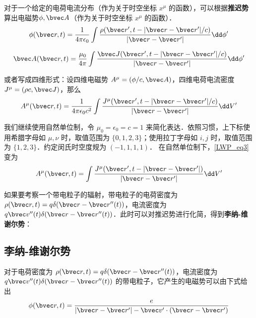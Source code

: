 

对于一个给定的电荷电流分布（作为关于时空坐标 $x^\mu$ 的函数），可以根据\textbf{推迟势}算出电磁势$\phi,\bvec A$（作为关于时空坐标 $x^\mu$ 的函数）．
\begin{equation}
\phi(\bvec r,t)=\frac{1}{4\pi\epsilon_0}\int \frac{\rho(\bvec r',t-|\bvec r-\bvec r'|/c)}{|\bvec r-\bvec r'|}\dd \phi'
\end{equation}

\begin{equation}
\bvec A(\bvec r,t)=\frac{\mu_0}{4\pi}\int \frac{\bvec J(\bvec r',t-|\bvec r-\bvec r'|/c)}{|\bvec r-\bvec r'|}\dd \phi'
\end{equation}

或者写成四维形式：设四维电磁势 $A^\mu=(\phi/c,\bvec A)$，四维电荷电流密度 $J^\mu=(\rho c,\bvec J)$，那么
\begin{equation}\label{LWP_eq3}
A^\mu(\bvec r,t)=\frac{1}{4\pi\epsilon_0c^2}\int \frac{J^\mu(\bvec r',t-|\bvec r-\bvec r'|/c)}{|\bvec r-\bvec r'|}\dd V'
\end{equation}

我们继续使用自然单位制，令 $\mu_0=\epsilon_0=c=1$ 来简化表达．依照习惯，上下标使用希腊字母如 $\mu, \nu$ 时，取值范围为 $\{0, 1, 2, 3\}$；使用拉丁字母如 $i, j$ 时，取值范围为 $\{1, 2, 3\}$．约定闵氏时空度规为 $(-1,1,1,1)$．
在自然单位制下，\autoref{LWP_eq3} 变为
\begin{equation}\label{LWP_eq4}
A^\mu(\bvec r,t)=\int \frac{J^\mu(\bvec r',t-|\bvec r-\bvec r'|)}{|\bvec r-\bvec r'|}\dd V'
\end{equation}

如果要考察一个带电粒子的辐射，带电粒子的电荷密度为 $\rho(\bvec r,t)=q\delta(\bvec r-\bvec r''(t))$，电流密度为 $q\bvec v''(t) \delta(\bvec r-\bvec r''(t))$．此时可以对推迟势进行化简，得到\textbf{李纳-维谢尔势}：
\subsection{李纳-维谢尔势}

对于电荷密度为 $\rho(\bvec r,t)=q\delta(\bvec r-\bvec r''(t))$，电流密度为 $q\bvec v''(t) \delta(\bvec r-\bvec r''(t))$ 的带电粒子，它产生的电磁势可以由下式给出
\begin{equation}\label{LWP_eq1}
\phi(\bvec r,t)=\frac{e}{|\bvec r-\bvec r'|-\bvec v'\cdot (\bvec r-\bvec r')}
\end{equation}

